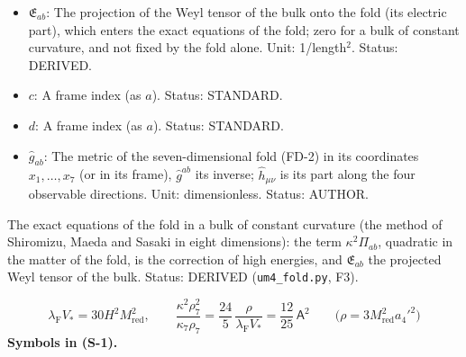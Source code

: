 \documentclass[
  10pt,
]{article}
\begin{document}
\begin{itemize}
  of the fold, quadratic in the matter \(\mathsf{t}_{ab}\) of the fold.
  Unit: GeV\(^{14}\). Status: DERIVED.
\item
  \(\mathfrak{E}_{ab}\): The projection of the Weyl tensor of the bulk
  onto the fold (its electric part), which enters the exact equations of
  the fold; zero for a bulk of constant curvature, and not fixed by the
  fold alone. Unit: 1/length\(^2\). Status: DERIVED.
\item
  \(c\): A frame index (as \(a\)). Status: STANDARD.
\item
  \(d\): A frame index (as \(a\)). Status: STANDARD.
\item
  \(\hat g_{ab}\): The metric of the seven-dimensional fold (FD-2) in
  its coordinates \(x_1, \dots, x_7\) (or in its frame), \(\hat g^{ab}\)
  its inverse; \(\hat h_{\mu\nu}\) is its part along the four observable
  directions. Unit: dimensionless. Status: AUTHOR.
\end{itemize}

The exact equations of the fold in a bulk of constant curvature (the
method of Shiromizu, Maeda and Sasaki in eight dimensions): the term
\(\kappa^2\Pi_{ab}\), quadratic in the matter of the fold, is the
correction of high energies, and \(\mathfrak{E}_{ab}\) the projected
Weyl tensor of the bulk. Status: DERIVED (\texttt{um4\_fold.py}, F3).

\[
\lambda_{\mathrm{F}}V_* = 30H^2M_{\mathrm{red}}^2,\qquad
\frac{\kappa^2\rho_7^2}{\kappa_7\rho_7} = \frac{24}{5}\,\frac{\rho}{\lambda_{\mathrm{F}}V_*} = \frac{12}{25}\,\mathsf{A}^2\qquad
\big(\rho = 3M_{\mathrm{red}}^2a_4'^2\big) \tag{S-1}
\] \textbf{Symbols in (S-1).}
\end{document}
